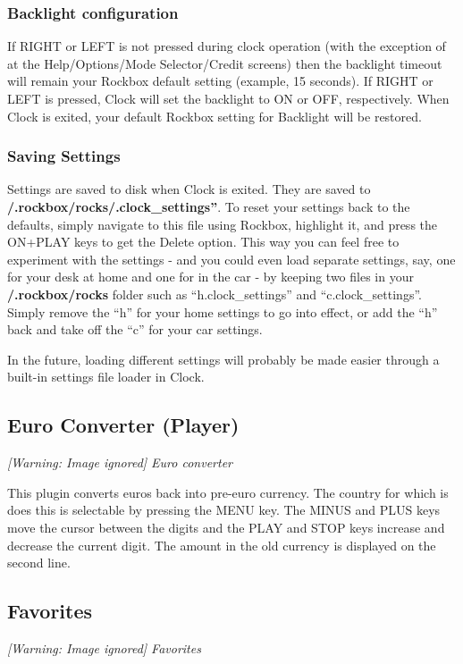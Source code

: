\subsubsection{Backlight configuration}
If RIGHT or LEFT is not pressed during clock operation (with the
exception of at the Help/Options/Mode Selector/Credit screens) then the
backlight timeout will remain your Rockbox default setting (example, 15
seconds). If RIGHT or LEFT is pressed, Clock will set the backlight to
ON or OFF, respectively. When Clock is exited, your default Rockbox
setting for Backlight will be restored. 

\subsubsection{Saving Settings}
Settings are saved to disk when Clock is exited. They are saved to
\textbf{/.rockbox/rocks/.clock\_settings''}. To reset your settings
back to the defaults, simply navigate to this file using Rockbox,
highlight it, and press the ON+PLAY keys to get the Delete option. This way you can feel free to experiment with the settings {}- and you could even load
separate settings, say, one for your desk at home and one for in the car {}- by keeping two files in your \textbf{/.rockbox/rocks} folder such as
``h.clock\_settings'' and ``c.clock\_settings''. Simply remove the
``h'' for your home settings to go into effect, or add the ``h'' back and take off the ``c'' for your car settings.

In the future, loading different settings will probably be made easier
through a built{}-in settings file loader in Clock. 

\subsection{Euro Converter (Player)}
{\centering\itshape
  [Warning: Image ignored] %
 \newline
Euro converter
\par}

This plugin converts euros back into pre{}-euro currency.  The country for which is does this is selectable by pressing the MENU key.  The MINUS and
PLUS keys move the cursor between the digits and the PLAY and STOP keys
increase and decrease the current digit.  The amount in the old
currency is displayed on the second line.

\subsection{Favorites}
{\centering\itshape
  [Warning: Image ignored] %
 \newline
Favorites
\par}

